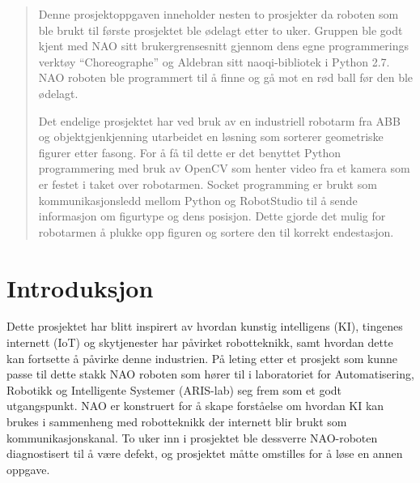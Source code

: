 \documentclass[conference]{IEEEtran}
\begin{document}
\begin{abstract}
    Denne prosjektoppgaven inneholder nesten to prosjekter da roboten som ble brukt til første prosjektet ble ødelagt etter to uker. 
    Gruppen ble godt kjent med NAO sitt brukergrensesnitt gjennom dens egne programmerings verktøy “Choreographe” og Aldebran sitt 
    naoqi-bibliotek i Python 2.7. NAO roboten ble programmert til å finne og gå mot en rød ball før den ble ødelagt. 

    Det endelige prosjektet har ved bruk av en industriell robotarm fra ABB og objektgjenkjenning utarbeidet en løsning som sorterer 
    geometriske figurer etter fasong. For å få til dette er det benyttet Python programmering med bruk av OpenCV som henter video fra 
    et kamera som er festet i taket over robotarmen. Socket programming er brukt som kommunikasjonsledd mellom Python og RobotStudio til 
    å sende informasjon om figurtype og dens posisjon. Dette gjorde det mulig for robotarmen å plukke opp figuren og sortere den til 
    korrekt endestasjon. 
\end{abstract}





%
\IEEEpeerreviewmaketitle



\section{Introduksjon}
Dette prosjektet har blitt inspirert av hvordan kunstig intelligens (KI), tingenes internett (IoT) og skytjenester har påvirket robotteknikk, 
samt hvordan dette kan fortsette å påvirke denne industrien. På leting etter et prosjekt som kunne passe til dette stakk NAO roboten som hører
til i laboratoriet for Automatisering, Robotikk og Intelligente Systemer (ARIS-lab) seg frem som et godt utgangspunkt. NAO er konstruert for å 
skape forståelse om hvordan KI kan brukes i sammenheng med robotteknikk der internett blir brukt som kommunikasjonskanal. To uker inn i prosjektet 
ble dessverre NAO-roboten diagnostisert til å være defekt, og prosjektet måtte omstilles for å løse en annen oppgave.  
\end{document}
